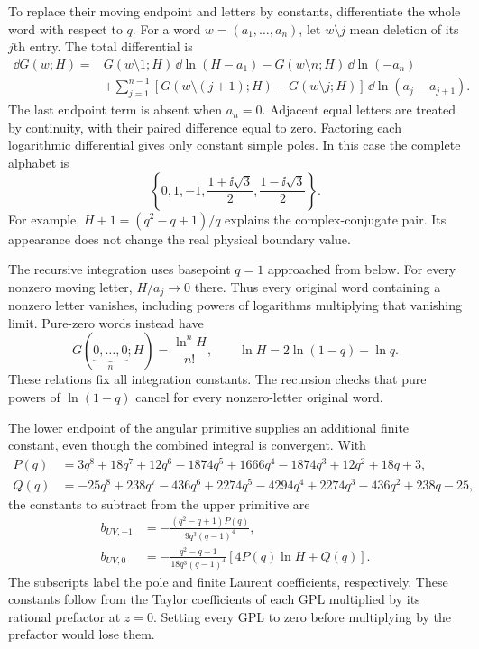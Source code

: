 To replace their moving endpoint and letters by constants, differentiate
the whole word with respect to $q$.  For a word $w=(a_1,\ldots,a_n)$,
let $w\setminus j$ mean deletion of its $j$th entry.  The total differential
is
\begin{align}
 \dd G(w;H)={}&G(w\setminus1;H)\,\dd\ln(H-a_1)
 -G(w\setminus n;H)\,\dd\ln(-a_n)\\
 &+\sum_{j=1}^{n-1}
 [G(w\setminus(j+1);H)-G(w\setminus j;H)]
                      \,\dd\ln(a_j-a_{j+1}).
\end{align}
The last endpoint term is absent when $a_n=0$.  Adjacent equal letters
are treated by continuity, with their paired difference equal to zero.
Factoring each logarithmic differential gives only constant simple poles.
In this case the complete alphabet is
\begin{equation}
 \left\{0,1,-1,\frac{1+\ii\sqrt3}{2},
                    \frac{1-\ii\sqrt3}{2}\right\}.
\end{equation}
For example, $H+1=(q^2-q+1)/q$ explains the complex-conjugate pair.
Its appearance does not change the real physical boundary value.

The recursive integration uses basepoint $q=1$ approached from below.
For every nonzero moving letter, $H/a_j\to0$ there.  Thus every original
word containing a nonzero letter vanishes, including powers of logarithms
multiplying that vanishing limit.  Pure-zero words instead have
\begin{equation}
 G(\underbrace{0,\ldots,0}_{n};H)=\frac{\ln^nH}{n!},\qquad
 \ln H=2\ln(1-q)-\ln q.
\end{equation}
These relations fix all integration constants.  The recursion checks that
pure powers of $\ln(1-q)$ cancel for every nonzero-letter original word.

The lower endpoint of the angular primitive supplies an additional finite
constant, even though the combined integral is convergent.  With
\begin{align}
 P(q)&=3q^8+18q^7+12q^6-1874q^5+1666q^4
                         -1874q^3+12q^2+18q+3,\\
 Q(q)&=-25q^8+238q^7-436q^6+2274q^5-4294q^4
                         +2274q^3-436q^2+238q-25,
\end{align}
the constants to subtract from the upper primitive are
\begin{align}
 b_{UV,-1}&=-\frac{(q^2-q+1)P(q)}{9q^3(q-1)^4},\\
 b_{UV,0}&=-\frac{q^2-q+1}{18q^3(q-1)^4}
                         [4P(q)\ln H+Q(q)].
\end{align}
The subscripts label the pole and finite Laurent coefficients, respectively.
These constants follow from the Taylor coefficients of each GPL multiplied
by its rational prefactor at $z=0$.  Setting every GPL to zero before
multiplying by the prefactor would lose them.

